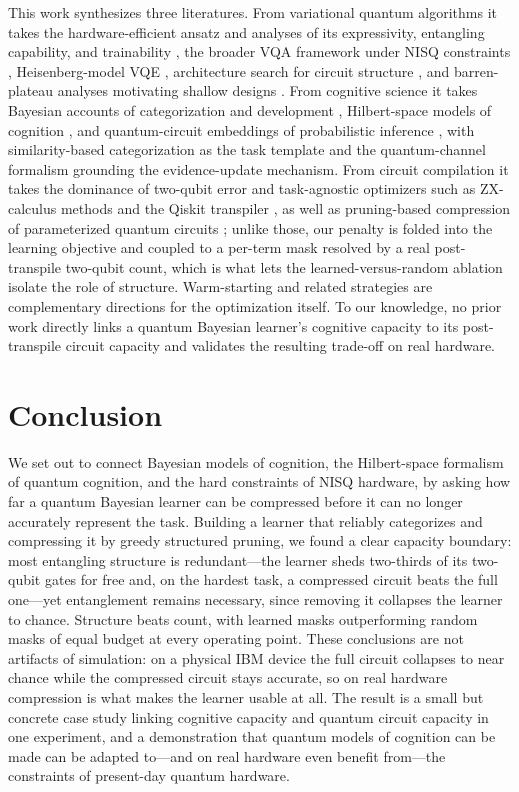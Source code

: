 \documentclass[conference]{IEEEtran}
\begin{document}
This work synthesizes three literatures. From variational quantum algorithms it takes the
hardware-efficient ansatz \cite{b4} and analyses of its expressivity, entangling
capability, and trainability \cite{b5,b27,b25}, the broader VQA framework \cite{b6} under
NISQ constraints \cite{b7,b20,b21}, Heisenberg-model VQE \cite{b14,b15}, architecture
search for circuit structure \cite{b16,b17}, and barren-plateau analyses motivating shallow
designs \cite{b18}. From cognitive science it takes Bayesian accounts of categorization and
development \cite{b1,b2,b11}, Hilbert-space models of cognition \cite{b3}, and
quantum-circuit embeddings of probabilistic inference \cite{b8,b9}, with similarity-based
categorization \cite{b19} as the task template and the quantum-channel formalism
\cite{b12,b13,b26} grounding the evidence-update mechanism. From circuit compilation it
takes the dominance of two-qubit error \cite{b7,b10} and task-agnostic optimizers such as
ZX-calculus methods \cite{b22,b23} and the Qiskit transpiler \cite{b24}, as well as
pruning-based compression of parameterized quantum circuits \cite{b29}; unlike those, our
penalty is folded into the learning objective and coupled to a per-term mask resolved by a
real post-transpile two-qubit count, which is what lets the learned-versus-random ablation
isolate the role of structure. Warm-starting and
related strategies \cite{b28} are complementary directions for the optimization itself. To
our knowledge, no prior work directly links a quantum Bayesian learner's cognitive capacity
to its post-transpile circuit capacity and validates the resulting trade-off on real
hardware.

\section{Conclusion}

We set out to connect Bayesian models of cognition, the Hilbert-space formalism of quantum
cognition, and the hard constraints of NISQ hardware, by asking how far a quantum Bayesian
learner can be compressed before it can no longer accurately represent the task. Building a learner that
reliably categorizes and compressing it by greedy structured pruning, we found a clear
capacity boundary: most entangling structure is redundant---the learner sheds two-thirds of
its two-qubit gates for free and, on the hardest task, a compressed circuit beats the full
one---yet entanglement remains necessary, since removing it collapses the learner to chance.
Structure beats count, with learned masks outperforming random masks of equal budget at
every operating point. These conclusions are not artifacts of simulation: on a physical IBM
device the full circuit collapses to near chance while the compressed circuit stays
accurate, so on real hardware compression is what makes the learner usable at all. The
result is a small but concrete case study linking cognitive capacity and quantum circuit
capacity in one experiment, and a demonstration that quantum models of cognition can be made
can be adapted to---and on real hardware even benefit from---the constraints of
present-day quantum hardware.
\end{document}
